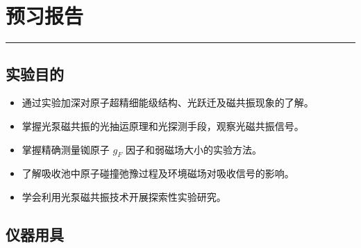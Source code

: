 
\clearpage
\setcounter{section}{0}
\section{预习报告}
\vspace{-0.7cm} %
\noindent\textcolor{fgraygreen}{\rule{0.382\textwidth}{2pt} }
\vspace{7pt}

\subsection{实验目的}
\begin{itemize}
    \item 通过实验加深对原子超精细能级结构、光跃迁及磁共振现象的了解。
    \item 掌握光泵磁共振的光抽运原理和光探测手段，观察光磁共振信号。
    \item 掌握精确测量铷原子 $ g_F $ 因子和弱磁场大小的实验方法。
    \item 了解吸收池中原子碰撞弛豫过程及环境磁场对吸收信号的影响。
    \item 学会利用光泵磁共振技术开展探索性实验研究。
\end{itemize}
\subsection{仪器用具}

